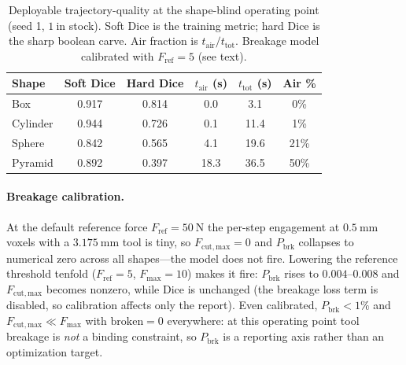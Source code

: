 \begin{table}[t]
  \centering
  \caption{Deployable trajectory-quality at the shape-blind operating point (seed 1, $1~\mathrm{in}$ stock). Soft Dice is the training metric; hard Dice is the sharp boolean carve. Air fraction is $t_{\mathrm{air}}/t_{\mathrm{tot}}$. Breakage model calibrated with $F_{\mathrm{ref}}{=}5$ (see text).}
  \label{tab:trajqual}
  \small
  \begin{tabular}{lcccc c}
    \toprule
    Shape & Soft Dice & Hard Dice & $t_{\mathrm{air}}$ (s) & $t_{\mathrm{tot}}$ (s) & Air \% \\
    \midrule
    Box      & 0.917 & 0.814 & 0.0  & 3.1  & 0\% \\
    Cylinder & 0.944 & 0.726 & 0.1  & 11.4 & 1\% \\
    Sphere   & 0.842 & 0.565 & 4.1  & 19.6 & 21\% \\
    Pyramid  & 0.892 & 0.397 & 18.3 & 36.5 & 50\% \\
    \bottomrule
  \end{tabular}
\end{table}

\paragraph{Breakage calibration.}
At the default reference force $F_{\mathrm{ref}}{=}50~\mathrm{N}$ the per-step
engagement at $0.5~\mathrm{mm}$ voxels with a $3.175~\mathrm{mm}$ tool is tiny,
so $F_{\mathrm{cut,max}}{=}0$ and $P_{\mathrm{brk}}$ collapses to numerical zero
across all shapes---the model does not fire. Lowering the reference threshold
tenfold ($F_{\mathrm{ref}}{=}5$, $F_{\mathrm{max}}{=}10$) makes it fire:
$P_{\mathrm{brk}}$ rises to $0.004$--$0.008$ and $F_{\mathrm{cut,max}}$ becomes
nonzero, while Dice is unchanged (the breakage loss term is disabled, so
calibration affects only the report). Even calibrated, $P_{\mathrm{brk}}<1\%$
and $F_{\mathrm{cut,max}} \ll F_{\mathrm{max}}$ with $\mathrm{broken}{=}0$
everywhere: at this operating point tool breakage is \emph{not} a binding
constraint, so $P_{\mathrm{brk}}$ is a reporting axis rather than an
optimization target.

